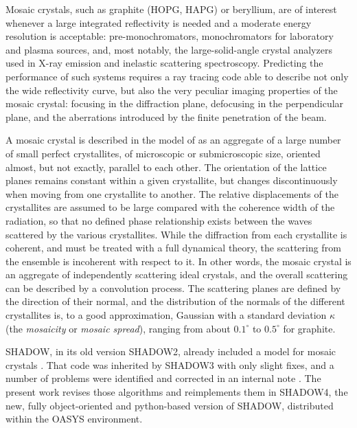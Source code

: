 \documentclass{iucr}
\begin{document}
Mosaic crystals, such as graphite (HOPG, HAPG) or beryllium, are of interest
whenever a large integrated reflectivity is needed and a moderate energy
resolution is acceptable: pre-monochromators, monochromators for laboratory and
plasma sources, and, most notably, the large-solid-angle crystal analyzers used in
X-ray emission and inelastic scattering spectroscopy. Predicting the performance of
such systems requires a ray tracing code able to describe not only the wide
reflectivity curve, but also the very peculiar imaging properties of the mosaic
crystal: focusing in the diffraction plane, defocusing in the perpendicular plane,
and the aberrations introduced by the finite penetration of the beam.

A mosaic crystal is described in the model of \cite{zachariasen1945theory} as an
aggregate of a large number of small perfect crystallites, of microscopic or
submicroscopic size, oriented almost, but not exactly, parallel to each other. The
orientation of the lattice planes remains constant within a given crystallite, but
changes discontinuously when moving from one crystallite to another. The relative
displacements of the crystallites are assumed to be large compared with the
coherence width of the radiation, so that no defined phase relationship exists
between the waves scattered by the various crystallites. While the diffraction from
each crystallite is coherent, and must be treated with a full dynamical theory, the
scattering from the ensemble is incoherent with respect to it. In other words, the
mosaic crystal is an aggregate of independently scattering ideal crystals, and the
overall scattering can be described by a convolution process. The scattering planes
are defined by the direction of their normal, and the distribution of the normals of
the different crystallites is, to a good approximation, Gaussian with a standard
deviation $\kappa$ (the \emph{mosaicity} or \emph{mosaic spread}), ranging from about
$0.1^\circ$ to $0.5^\circ$ for graphite.

SHADOW, in its old version SHADOW2, already included a model for mosaic crystals
\cite{mosaicsSanchezDelRio1992, Scordo2021}. That code was inherited by SHADOW3
\cite{codeSHADOW} with only slight fixes, and a number of problems were identified
and corrected in an internal note \cite{mosaicsSanchezDelRio2013}. The present work
revises those algorithms and reimplements them in SHADOW4,
the new, fully object-oriented and python-based version of SHADOW, distributed
within the OASYS \cite{codeOASYS} environment.
\end{document}
